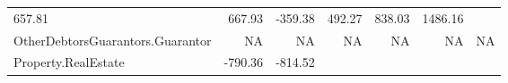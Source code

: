 \documentclass[]{article}
\begin{document}
\begin{longtable}[]{@{}lrrrrrr@{}}
\begin{minipage}[t]{0.10\columnwidth}
657.81\strut
\end{minipage} & \begin{minipage}[t]{0.08\columnwidth}\raggedleft\strut
667.93\strut
\end{minipage} & \begin{minipage}[t]{0.08\columnwidth}\raggedleft\strut
-359.38\strut
\end{minipage} & \begin{minipage}[t]{0.08\columnwidth}\raggedleft\strut
492.27\strut
\end{minipage} & \begin{minipage}[t]{0.08\columnwidth}\raggedleft\strut
838.03\strut
\end{minipage} & \begin{minipage}[t]{0.08\columnwidth}\raggedleft\strut
1486.16\strut
\end{minipage}\tabularnewline
\begin{minipage}[t]{0.31\columnwidth}\raggedright\strut
OtherDebtorsGuarantors.Guarantor\strut
\end{minipage} & \begin{minipage}[t]{0.10\columnwidth}\raggedleft\strut
NA\strut
\end{minipage} & \begin{minipage}[t]{0.08\columnwidth}\raggedleft\strut
NA\strut
\end{minipage} & \begin{minipage}[t]{0.08\columnwidth}\raggedleft\strut
NA\strut
\end{minipage} & \begin{minipage}[t]{0.08\columnwidth}\raggedleft\strut
NA\strut
\end{minipage} & \begin{minipage}[t]{0.08\columnwidth}\raggedleft\strut
NA\strut
\end{minipage} & \begin{minipage}[t]{0.08\columnwidth}\raggedleft\strut
NA\strut
\end{minipage}\tabularnewline
\begin{minipage}[t]{0.31\columnwidth}\raggedright\strut
Property.RealEstate\strut
\end{minipage} & \begin{minipage}[t]{0.10\columnwidth}\raggedleft\strut
-790.36\strut
\end{minipage} & \begin{minipage}[t]{0.08\columnwidth}\raggedleft\strut
-814.52\strut
\end{minipage} & \begin{minipage}[t]{0.08\columnwidth}\raggedleft\strut

\end{minipage}
\end{longtable}
\end{document}

